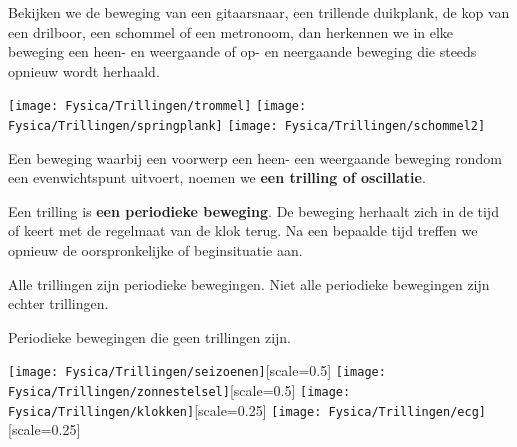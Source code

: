 \documentclass{ximera}
\begin{document}
    \author{Ingmar Herreman}
    \date{Januari 2024}


Bekijken we de beweging van een gitaarsnaar, een trillende duikplank, de kop van een drilboor, een schommel of een metronoom, dan herkennen we in elke beweging een heen- en weergaande of op- en neergaande beweging die steeds opnieuw wordt herhaald.

\begin{image}[\textwidth]
    \texttt{[image: Fysica/Trillingen/trommel]}
    \texttt{[image: Fysica/Trillingen/springplank]}
    \texttt{[image: Fysica/Trillingen/schommel2]}
\end{image}
 
\begin{definition}
Een beweging waarbij een voorwerp een heen- een weergaande beweging rondom een evenwichtspunt uitvoert, noemen we \textbf{een trilling of oscillatie}.
\end{definition}


Een trilling is \textbf{een periodieke beweging}. De beweging herhaalt zich in de tijd of keert met de regelmaat van de klok terug. Na een bepaalde tijd treffen we opnieuw de oorspronkelijke of beginsituatie aan.

\begin{remark}
Alle trillingen zijn periodieke bewegingen. Niet alle periodieke bewegingen zijn echter trillingen.
\begin{example} 
    Periodieke bewegingen die geen trillingen zijn.
    \begin{center}
        \texttt{[image: Fysica/Trillingen/seizoenen]}[scale=0.5]
        \texttt{[image: Fysica/Trillingen/zonnestelsel]}[scale=0.5]
        \texttt{[image: Fysica/Trillingen/klokken]}[scale=0.25]
        \texttt{[image: Fysica/Trillingen/ecg]}[scale=0.25]
    \end{center}
\end{example}
\end{remark}
\end{document}
